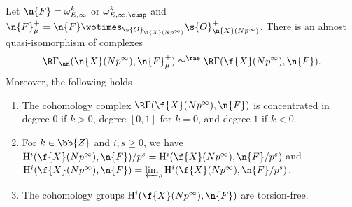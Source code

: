 \begin{theo}
\label{Theo2Intro}
Let $\n{F}= \omega^k_{E,\infty}$ or $\omega^k_{E,\infty,\cusp}$ and $\n{F}_{\mu}^+=\n{F}\wotimes_{\s{O}_{\f{X}(Np^\infty)}} \s{O}^+_{\n{X}(Np^\infty)}$. There is an almost quasi-isomorphism of complexes
\[
\R \Gamma_{\an}(\n{X}(Np^\infty), \n{F}^+_{\mu}) \simeq^{\rae} \R \Gamma(\f{X}(Np^\infty), \n{F}).
\]
Moreover, the following holds
\begin{enumerate}

\item The cohomology complex $\R \Gamma(\f{X}(Np^\infty), \n{F})$ is concentrated in degree $0$ if $k>0$, degree $[0,1]$ for $k=0$, and degree $1$ if $k<0$.

\item For $k\in \bb{Z}$ and $i,s\geq 0$, we have $\mathrm{H}^i(\f{X}(Np^\infty), \n{F})/p^s = \mathrm{H}^i(\f{X}(Np^\infty), \n{F}/p^s)$ and $\mathrm{H}^i(\f{X}(Np^\infty), \n{F})= \varprojlim_s \mathrm{H}^i(\f{X}(Np^\infty), \n{F}/p^s)$.

\item The cohomology groups $\mathrm{H}^i(\f{X}(Np^\infty), \n{F})$ are torsion-free.
\end{enumerate}
\end{theo}

